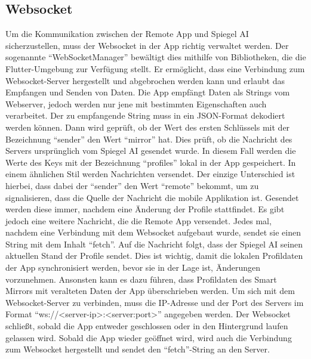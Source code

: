 \subsection{Websocket}
Um die Kommunikation zwischen der Remote App und Spiegel AI sicherzustellen, muss der Websocket in der App richtig verwaltet werden. Der sogenannte \enquote{WebSocketManager} bewältigt dies mithilfe von Bibliotheken, die die Flutter-Umgebung zur Verfügung stellt. Er ermöglicht, dass eine Verbindung zum Websocket-Server hergestellt und abgebrochen werden kann und erlaubt das Empfangen und Senden von Daten. Die App empfängt Daten als Strings vom Webserver, jedoch werden nur jene mit bestimmten Eigenschaften auch verarbeitet. Der zu empfangende String muss in ein JSON-Format dekodiert werden können. Dann wird geprüft, ob der Wert des ersten Schlüssels mit der Bezeichnung \enquote{sender} den Wert \enquote{mirror} hat. Dies prüft, ob die Nachricht des Servers ursprünglich vom Spiegel AI gesendet wurde. In diesem Fall werden die Werte des Keys mit der Bezeichnung \enquote{profiles} lokal in der App gespeichert. In einem ähnlichen Stil werden Nachrichten versendet. Der einzige Unterschied ist hierbei, dass dabei der \enquote{sender} den Wert \enquote{remote} bekommt, um zu signalisieren, dass die Quelle der Nachricht die mobile Applikation ist. Gesendet werden diese immer, nachdem eine Änderung der Profile stattfindet. Es gibt jedoch eine weitere Nachricht, die die Remote App versendet. Jedes mal, nachdem eine Verbindung mit dem Websocket aufgebaut wurde, sendet sie einen String mit dem Inhalt \enquote{fetch}. Auf die Nachricht folgt, dass der Spiegel AI seinen aktuellen Stand der Profile sendet. Dies ist wichtig, damit die lokalen Profildaten der App synchronisiert werden, bevor sie in der Lage ist, Änderungen vorzunehmen. Ansonsten kann es dazu führen, dass Profildaten des Smart Mirrors mit veralteten Daten der App überschrieben werden. Um sich mit dem Websocket-Server zu verbinden, muss die IP-Adresse und der Port des Servers im Format \enquote{ws://<server-ip>:<server:port>} angegeben werden. Der Websocket schließt, sobald die App entweder geschlossen oder in den Hintergrund laufen gelassen wird. Sobald die App wieder geöffnet wird, wird auch die Verbindung zum Websocket hergestellt und sendet den \enquote{fetch}-String an den Server.

